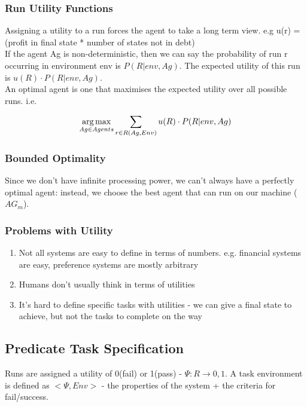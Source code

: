 \subsubsection{Run Utility Functions}
Assigning a utility to a run forces the agent to take a long term view. e.g u(r) = (profit in final state * number of states not in debt) \\

If the agent Ag is non-deterministic, then we can say the probability of run r occurring in environment env is $P(R|env,Ag)$. The expected utility of this run is $u(R) \cdot P(R|env,Ag)$.\\ 

An optimal agent is one that maximises the expected utility over all possible runs. i.e.

\[
    \operatorname*{arg\,max}_{Ag\in Agents} \sum_{r\in R(Ag,Env)} u(R) \cdot P(R|env,Ag)
\]

\subsubsection{Bounded Optimality}
Since we don't have infinite processing power, we can't always have a perfectly optimal agent: instead, we choose the best agent that can run on our machine ($AG_m$).

\subsubsection{Problems with Utility}
\begin{enumerate}
    \item Not all systems are easy to define in terms of numbers. e.g. financial systems are easy, preference systems are mostly arbitrary
    \item Humans don't usually think in terms of utilities
    \item It's hard to define specific tasks with utilities - we can give a final state to achieve, but not the tasks to complete on the way
\end{enumerate}

\subsection{Predicate Task Specification}
Runs are assigned a utility of 0(fail) or 1(pass) - $\Psi:R\rightarrow {0,1}$. A task environment is defined as $<\Psi, Env>$ - the properties of the system + the criteria for fail/success. \\

